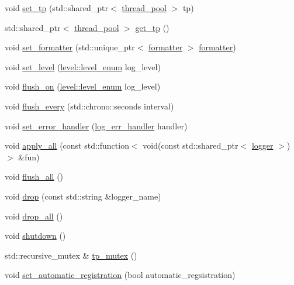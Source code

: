 \begin{DoxyCompactItemize}
\item 
void \hyperlink{classspdlog_1_1details_1_1registry_aa5503db04a70a06f97e7c1218aa8cbe2}{set\+\_\+tp} (std\+::shared\+\_\+ptr$<$ \hyperlink{classspdlog_1_1details_1_1thread__pool}{thread\+\_\+pool} $>$ tp)
\item 
std\+::shared\+\_\+ptr$<$ \hyperlink{classspdlog_1_1details_1_1thread__pool}{thread\+\_\+pool} $>$ \hyperlink{classspdlog_1_1details_1_1registry_af86cd2fcbec489ebc343815f49a6e076}{get\+\_\+tp} ()
\item 
void \hyperlink{classspdlog_1_1details_1_1registry_a8f8dcb7f6b7987716cfbcb92bbe96517}{set\+\_\+formatter} (std\+::unique\+\_\+ptr$<$ \hyperlink{classspdlog_1_1formatter}{formatter} $>$ \hyperlink{classspdlog_1_1formatter}{formatter})
\item 
void \hyperlink{classspdlog_1_1details_1_1registry_a4b8494e781ed3151586b307cca63edb7}{set\+\_\+level} (\hyperlink{namespacespdlog_1_1level_a35f5227e5daf228d28a207b7b2aefc8b}{level\+::level\+\_\+enum} log\+\_\+level)
\item 
void \hyperlink{classspdlog_1_1details_1_1registry_a34841160632afca0f2063f1d55629d73}{flush\+\_\+on} (\hyperlink{namespacespdlog_1_1level_a35f5227e5daf228d28a207b7b2aefc8b}{level\+::level\+\_\+enum} log\+\_\+level)
\item 
void \hyperlink{classspdlog_1_1details_1_1registry_a78eb75a31640c0bb204d7f2123ba825c}{flush\+\_\+every} (std\+::chrono\+::seconds interval)
\item 
void \hyperlink{classspdlog_1_1details_1_1registry_a47543b9b7ebe0dc3664cfd5f3e385905}{set\+\_\+error\+\_\+handler} (\hyperlink{namespacespdlog_ad3ed787a29f245c833ef66faf48036e2}{log\+\_\+err\+\_\+handler} handler)
\item 
void \hyperlink{classspdlog_1_1details_1_1registry_a781454ea62603cfaebddf14ec2ec9985}{apply\+\_\+all} (const std\+::function$<$ void(const std\+::shared\+\_\+ptr$<$ \hyperlink{classspdlog_1_1logger}{logger} $>$)$>$ \&fun)
\item 
void \hyperlink{classspdlog_1_1details_1_1registry_a3abe5826eebb056d51dd0dd75beed42d}{flush\+\_\+all} ()
\item 
void \hyperlink{classspdlog_1_1details_1_1registry_a21f513aa5a7da6a21fe35a5077b2db74}{drop} (const std\+::string \&logger\+\_\+name)
\item 
void \hyperlink{classspdlog_1_1details_1_1registry_a127ccc3786f6ddef57f16d354ba4db91}{drop\+\_\+all} ()
\item 
void \hyperlink{classspdlog_1_1details_1_1registry_ac93f888f316b0488414771ad6533b6a9}{shutdown} ()
\item 
std\+::recursive\+\_\+mutex \& \hyperlink{classspdlog_1_1details_1_1registry_a0fddfd080598f35c675d618cb5e414c6}{tp\+\_\+mutex} ()
\item 
void \hyperlink{classspdlog_1_1details_1_1registry_a0cfc3780c18f5331ad31ea1d40248952}{set\+\_\+automatic\+\_\+registration} (bool automatic\+\_\+regsistration)
\end{DoxyCompactItemize}
